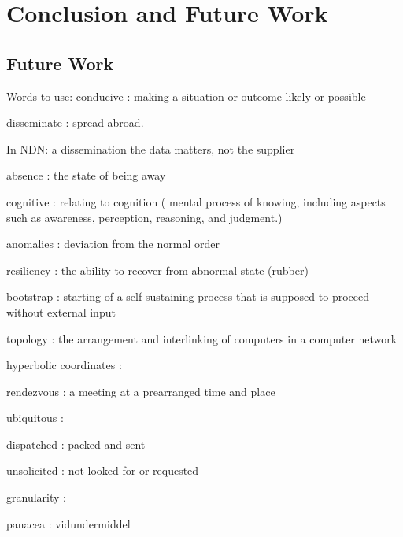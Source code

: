 \chapter{Conclusion and Future Work}\label{chp7:conclusion}

\section{Future Work}


Words to use:
conducive : making a situation or outcome likely or possible

disseminate : spread abroad. 

In NDN: a dissemination the data matters, not the supplier

absence : the state of being away

cognitive : relating to cognition ( mental process of knowing, including aspects such as awareness, perception, reasoning, and judgment.)

anomalies : deviation from the normal order

resiliency : the ability to recover from abnormal state (rubber)

bootstrap : starting of a self-sustaining process that is supposed to proceed without external input

topology : the arrangement and interlinking of computers in a computer network

hyperbolic coordinates : 

rendezvous : a meeting at a prearranged time and place

ubiquitous : 

dispatched : packed and sent					

unsolicited : not looked for or requested

granularity : 

panacea : vidundermiddel